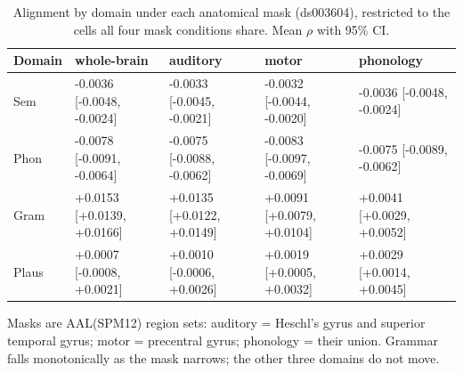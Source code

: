 \begin{table}[t]
\centering
\small
\begin{tabular}{lllll}
\toprule
Domain & whole-brain & auditory & motor & phonology \\
\midrule
Sem & -0.0036 [-0.0048, -0.0024] & -0.0033 [-0.0045, -0.0021] & -0.0032 [-0.0044, -0.0020] & -0.0036 [-0.0048, -0.0024] \\
Phon & -0.0078 [-0.0091, -0.0064] & -0.0075 [-0.0088, -0.0062] & -0.0083 [-0.0097, -0.0069] & -0.0075 [-0.0089, -0.0062] \\
Gram & +0.0153 [+0.0139, +0.0166] & +0.0135 [+0.0122, +0.0149] & +0.0091 [+0.0079, +0.0104] & +0.0041 [+0.0029, +0.0052] \\
Plaus & +0.0007 [-0.0008, +0.0021] & +0.0010 [-0.0006, +0.0026] & +0.0019 [+0.0005, +0.0032] & +0.0029 [+0.0014, +0.0045] \\
\bottomrule
\end{tabular}
\vspace{2pt}
\begin{minipage}{\linewidth}\footnotesize Masks are AAL(SPM12) region sets: auditory = Heschl's gyrus and superior temporal gyrus; motor = precentral gyrus; phonology = their union. Grammar falls monotonically as the mask narrows; the other three domains do not move.\end{minipage}
\caption{Alignment by domain under each anatomical mask (ds003604), restricted to the cells all four mask conditions share. Mean $\rho$ with 95\% CI.}
\label{tab:t3}
\end{table}

